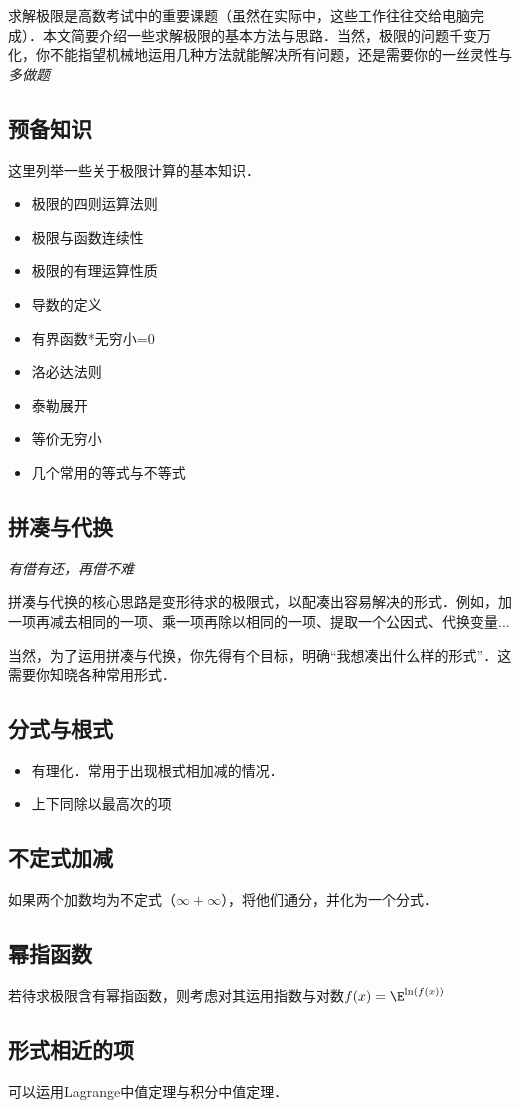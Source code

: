 
\begin{issues}
\issueDraft
\end{issues}

求解极限是高数考试中的重要课题（虽然在实际中，这些工作往往交给电脑完成）．本文简要介绍一些求解极限的基本方法与思路．当然，极限的问题千变万化，你不能指望机械地运用几种方法就能解决所有问题，还是需要你的一丝灵性与\textsl{多做题}

\subsection{预备知识}
这里列举一些关于极限计算的基本知识．
\begin{itemize}
\item 极限的四则运算法则
\item 极限与函数连续性
\item 极限的有理运算性质
\item 导数的定义
\item 有界函数*无穷小=0
\item 洛必达法则
\item 泰勒展开
\item 等价无穷小
\item 几个常用的等式与不等式
\end{itemize}

\subsection{拼凑与代换}
\textsl{有借有还，再借不难}

拼凑与代换的核心思路是变形待求的极限式，以配凑出容易解决的形式．例如，加一项再减去相同的一项、乘一项再除以相同的一项、提取一个公因式、代换变量...

当然，为了运用拼凑与代换，你先得有个目标，明确“我想凑出什么样的形式”．这需要你知晓各种常用形式．

\subsection{分式与根式}
\begin{itemize}
\item 有理化．常用于出现根式相加减的情况．
\item 上下同除以最高次的项
\end{itemize}

\subsection{不定式加减}
如果两个加数均为不定式（$\infty+\infty$），将他们通分，并化为一个分式．

\subsection{幂指函数}
若待求极限含有幂指函数，则考虑对其运用指数与对数$f(x)=\E^{\ln(f(x))}$

\subsection{形式相近的项}
可以运用Lagrange中值定理与积分中值定理．